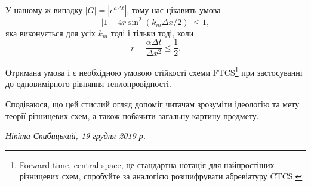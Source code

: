 У нашому ж випадку $|G| = |e^{a \Delta t}|$, тому нас цікавить умова
\begin{equation}
    \Big| 1 - 4 r \sin^2(k_m \Delta x / 2) \Big| \le 1,
\end{equation}
яка виконується для усіх $k_m$ тоді і тільки тоді, коли
\begin{equation}
    r = \frac{\alpha \Delta t}{\Delta x^2} \le \frac{1}{2}.
\end{equation}

Отримана умова і є необхідною умовою стійкості схеми FTCS\footnote{Forward time, central space, це стандартна нотація для найпростіших різницевих схем, спробуйте за аналогією розшифрувати абревіатуру CTCS.} при застосуванні до одновимірного рівняння теплопровідності. \bigskip

\begin{minipage}{.40\textwidth}
    \nothing
\end{minipage}
\begin{minipage}{.57\textwidth}
    Сподіваюся, що цей стислий огляд допоміг читачам
    зрозуміти ідеологію та мету теорії різницевих схем,
    а також побачити загальну картину предмету.
    \smallskip

    \begin{flushright}
        \textit{Нікіта Скибицький, 19 грудня 2019 р.}
    \end{flushright}
\end{minipage}

